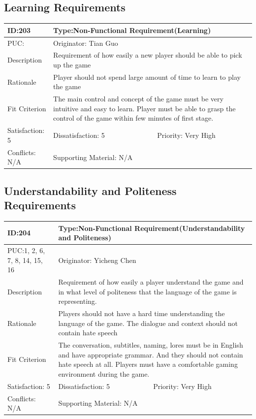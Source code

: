 \documentclass{article}
\begin{document}
	\subsection{Learning Requirements}
	\begin{table}[H]
		\begin{tabular}{|l|l|l|}
			\hline
			ID:203 & \multicolumn{2}{l|}{Type:Non-Functional Requirement(Learning)} \\ \hline
			PUC: & \multicolumn{2}{l|}{Originator: Tian Guo} \\ \hline
			Description & \multicolumn{2}{m{0.85\textwidth}|}{Requirement of how easily a new player should be able to pick up the game} \\ \hline
			Rationale & \multicolumn{2}{m{0.85\textwidth}|}{Player should not spend large amount of time to learn to play the game} \\ \hline
			Fit Criterion & \multicolumn{2}{m{0.85\textwidth}|}{The main control and concept of the game must be very intuitive and easy to learn. Player must be able to grasp the control of the game within few minutes of first stage.} \\ \hline
			Satisfaction: 5 & Dissatisfaction: 5 & Priority: Very High \\ \hline
			Conflicts: N/A & \multicolumn{2}{l|}{Supporting Material: N/A} \\ \hline
		\end{tabular}
	\end{table}

	\subsection{Understandability and Politeness Requirements}
	\begin{table}[H]
		\begin{tabular}{|l|l|l|}
			\hline
			ID:204 & \multicolumn{2}{l|}{Type:Non-Functional Requirement(Understandability and Politeness)} \\ \hline
			PUC:1, 2, 6, 7, 8, 14, 15, 16 & \multicolumn{2}{l|}{Originator: Yicheng Chen} \\ \hline
			Description & \multicolumn{2}{m{0.85\textwidth}|}{Requirement of how easily a player understand the game and in what level of politeness that the language of the game is representing.} \\ \hline
			Rationale & \multicolumn{2}{m{0.85\textwidth}|}{Players should not have a hard time understanding the language of the game. The dialogue and context should not contain hate speech} \\ \hline
			Fit Criterion & \multicolumn{2}{m{0.85\textwidth}|}{The conversation, subtitles, naming, lores must be in English and have appropriate grammar. And they should not contain hate speech at all. Players must have a comfortable gaming environment during the game.} \\ \hline
			Satisfaction: 5 & Dissatisfaction: 5 & Priority: Very High \\ \hline
			Conflicts: N/A & \multicolumn{2}{l|}{Supporting Material: N/A} \\ \hline
		\end{tabular}
	\end{table}
\end{document}
